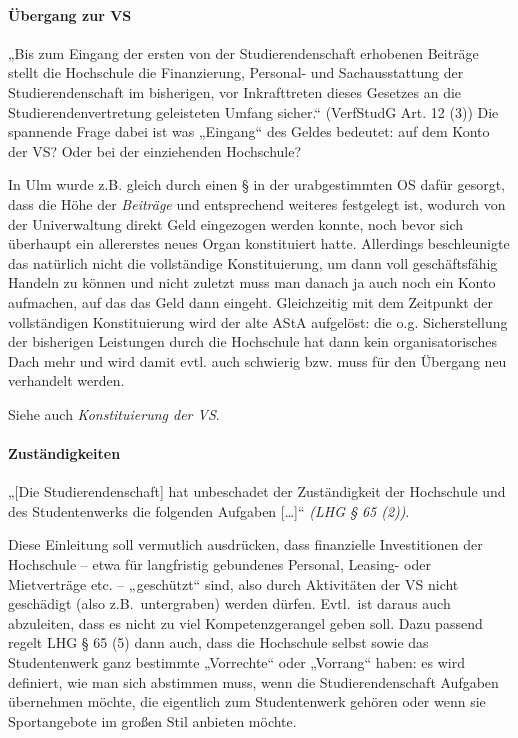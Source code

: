 \documentclass[
10pt,
a4paper,
twoside,								%
titlepage=false,							%
draft=false								%
]{scrartcl}
\begin{document}
\paragraph{Übergang zur VS}

„Bis zum Eingang der ersten von der Studierendenschaft erhobenen Beiträge stellt die Hochschule die Finanzierung, Personal- und Sachausstattung der Studierendenschaft im bisherigen, vor Inkrafttreten dieses Gesetzes an die Studierendenvertretung geleisteten Umfang sicher.“ (VerfStudG Art. 12 (3)) Die spannende Frage dabei ist was „Eingang“ des Geldes bedeutet: auf dem Konto der VS? Oder bei der einziehenden Hochschule?

In Ulm wurde z.B. gleich durch einen § in der urabgestimmten OS dafür gesorgt, dass die Höhe der \emph{Beiträge} und entsprechend weiteres festgelegt ist, wodurch von der Univerwaltung direkt Geld eingezogen werden konnte, noch bevor sich überhaupt ein allererstes neues Organ konstituiert hatte. Allerdings beschleunigte das natürlich nicht die vollständige Konstituierung, um dann voll geschäftsfähig Handeln zu können und nicht zuletzt muss man danach ja auch noch ein Konto aufmachen, auf das das Geld dann eingeht. Gleichzeitig mit dem Zeitpunkt der vollständigen Konstituierung wird der alte AStA aufgelöst: die o.g. Sicherstellung der bisherigen Leistungen durch die Hochschule hat dann kein organisatorisches Dach mehr und wird damit evtl. auch schwierig bzw. muss für den Übergang neu verhandelt werden.

Siehe auch \emph{Konstituierung der VS}.



\paragraph{Zuständigkeiten\label{Glossar:Zuständigkeiten}}

„[Die Studierendenschaft] hat unbeschadet der Zuständigkeit der Hochschule und des Studentenwerks die folgenden Aufgaben […]“ \textit{(LHG § 65 (2))}.

Diese Einleitung soll vermutlich ausdrücken, dass finanzielle Investitionen der Hochschule – etwa für langfristig gebundenes Personal, Leasing- oder Mietverträge etc. – „geschützt“ sind, also durch Aktivitäten der VS nicht geschädigt (also z.B.~untergraben) werden dürfen. Evtl.~ist daraus auch abzuleiten, dass es nicht zu viel Kompetenzgerangel geben soll. Dazu passend regelt LHG § 65 (5) dann auch, dass die Hochschule selbst sowie das Studentenwerk ganz bestimmte „Vorrechte“ oder „Vorrang“ haben: es wird definiert, wie man sich abstimmen muss, wenn die Studierendenschaft Aufgaben übernehmen möchte, die eigentlich zum Studentenwerk gehören oder wenn sie Sportangebote im großen Stil anbieten möchte.
\end{document}
